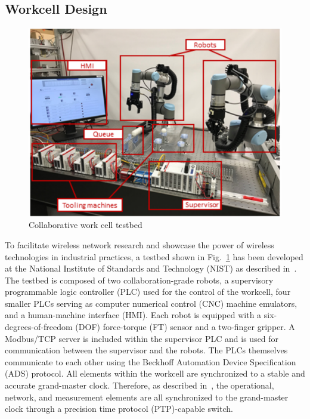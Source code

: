 \subsection{Workcell Design}

\begin{figure}
	\centering
	\includegraphics[width=\textwidth]{./chapter-gdb-appl/figures/cellShot}
	\caption{Collaborative work cell testbed}
	\label{gdbappl:fig::workcell}
\end{figure}

To facilitate wireless network research and showcase the power of wireless technologies in industrial practices, a testbed shown in Fig.~\ref{gdbappl:fig::workcell} has been developed at the National Institute of Standards and Technology (NIST) as described in~\cite{Liu2019vancouver}. The testbed is composed of two collaboration-grade robots, a supervisory programmable logic controller (PLC) used for the control of the workcell, four smaller PLCs serving as computer numerical control (CNC) machine emulators, and a human-machine interface (HMI).  Each robot is equipped with a six-degrees-of-freedom (DOF) force-torque (FT) sensor and a two-finger gripper. A Modbus/TCP server is included within the supervisor PLC and is used for communication between the supervisor and the robots.  The PLCs themselves communicate to each other using the Beckhoff Automation Device Specification (ADS) protocol. All elements within the workcell are synchronized to a stable and accurate grand-master clock. Therefore, as described in~\cite{Liu2019vancouver}, the operational, network, and measurement elements are all synchronized to the grand-master clock through a precision time protocol (PTP)-capable switch. 

